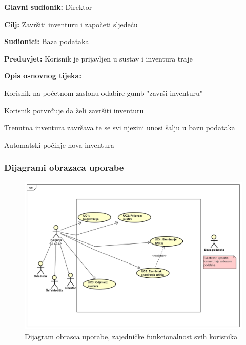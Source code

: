 					\noindent {}
					\begin{packed_item}
						\item \textbf{Glavni sudionik: }Direktor
						\item  \textbf{Cilj:} Završiti inventuru i započeti sljedeću
						\item  \textbf{Sudionici:} Baza podataka
						\item  \textbf{Preduvjet:} Korisnik je prijavljen u sustav i inventura traje
						\item  \textbf{Opis osnovnog tijeka:}
						
						\item[] \begin{packed_enum}
							\item Korisnik na početnom zaslonu odabire gumb "završi inventuru"
							\item Korisnik potvrđuje da želi završiti inventuru
							\item Trenutna inventura završava te se svi njezini unosi šalju u bazu podataka
							\item Automatski počinje nova inventura
						\end{packed_enum}
					\end{packed_item}

				\subsubsection{Dijagrami obrazaca uporabe}
					
					\begin{figure}[H]
						\includegraphics[scale=0.5]{slike/uc1.png}
						\caption{Dijagram obrasca uporabe, zajedničke funkcionalnost svih korisnika}
						
					\end{figure}
				
